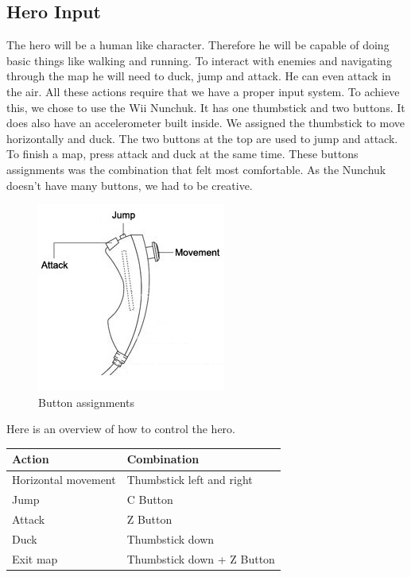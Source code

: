 \subsection*{Hero Input} %
The hero will be a human like character. Therefore he will be capable of doing basic things like walking and running. To interact with enemies and navigating through the map he will need to duck, jump and attack. He can even attack in the air. All these actions require that we have a proper input system.
\newline
To achieve this, we chose to use the Wii Nunchuk. It has one thumbstick and two buttons. It does also have an accelerometer built inside. We assigned the thumbstick to move horizontally and duck. The two buttons at the top are used to jump and attack. To finish a map, press attack and duck at the same time.
\newline
These buttons assignments was the combination that felt most comfortable. As the Nunchuk doesn't have many buttons, we had to be creative.

\begin{figure}[H]
  \centering
  \includegraphics[scale=0.6]{Figures/nunchuk}
  \caption{Button assignments}
  \label{fig:Nunchuk}
\end{figure}

Here is an overview of how to control the hero.

\begin{table}[H]
    \centering
    \begin{tabular}{ll}
    Action               & Combination                \\ \hline
    Horizontal movement  & Thumbstick left and right  \\
    Jump                 & C Button                   \\
    Attack               & Z Button                   \\
    Duck                 & Thumbstick down            \\
    Exit map             & Thumbstick down + Z Button \\
    \end{tabular}
\end{table}


